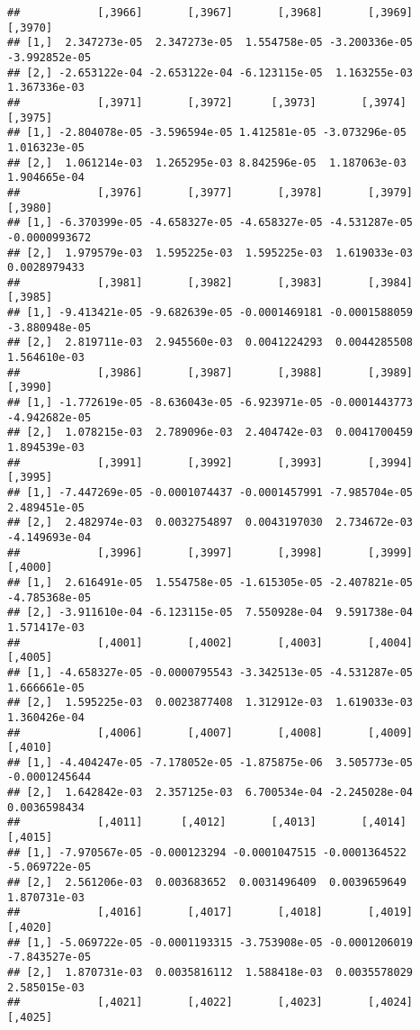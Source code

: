 \documentclass[
]{article}
\begin{document}
\begin{verbatim}
##            [,3966]       [,3967]       [,3968]       [,3969]       [,3970]
## [1,]  2.347273e-05  2.347273e-05  1.554758e-05 -3.200336e-05 -3.992852e-05
## [2,] -2.653122e-04 -2.653122e-04 -6.123115e-05  1.163255e-03  1.367336e-03
##            [,3971]       [,3972]      [,3973]       [,3974]      [,3975]
## [1,] -2.804078e-05 -3.596594e-05 1.412581e-05 -3.073296e-05 1.016323e-05
## [2,]  1.061214e-03  1.265295e-03 8.842596e-05  1.187063e-03 1.904665e-04
##            [,3976]       [,3977]       [,3978]       [,3979]       [,3980]
## [1,] -6.370399e-05 -4.658327e-05 -4.658327e-05 -4.531287e-05 -0.0000993672
## [2,]  1.979579e-03  1.595225e-03  1.595225e-03  1.619033e-03  0.0028979433
##            [,3981]       [,3982]       [,3983]       [,3984]       [,3985]
## [1,] -9.413421e-05 -9.682639e-05 -0.0001469181 -0.0001588059 -3.880948e-05
## [2,]  2.819711e-03  2.945560e-03  0.0041224293  0.0044285508  1.564610e-03
##            [,3986]       [,3987]       [,3988]       [,3989]       [,3990]
## [1,] -1.772619e-05 -8.636043e-05 -6.923971e-05 -0.0001443773 -4.942682e-05
## [2,]  1.078215e-03  2.789096e-03  2.404742e-03  0.0041700459  1.894539e-03
##            [,3991]       [,3992]       [,3993]       [,3994]       [,3995]
## [1,] -7.447269e-05 -0.0001074437 -0.0001457991 -7.985704e-05  2.489451e-05
## [2,]  2.482974e-03  0.0032754897  0.0043197030  2.734672e-03 -4.149693e-04
##            [,3996]       [,3997]       [,3998]       [,3999]       [,4000]
## [1,]  2.616491e-05  1.554758e-05 -1.615305e-05 -2.407821e-05 -4.785368e-05
## [2,] -3.911610e-04 -6.123115e-05  7.550928e-04  9.591738e-04  1.571417e-03
##            [,4001]       [,4002]       [,4003]       [,4004]      [,4005]
## [1,] -4.658327e-05 -0.0000795543 -3.342513e-05 -4.531287e-05 1.666661e-05
## [2,]  1.595225e-03  0.0023877408  1.312912e-03  1.619033e-03 1.360426e-04
##            [,4006]       [,4007]       [,4008]       [,4009]       [,4010]
## [1,] -4.404247e-05 -7.178052e-05 -1.875875e-06  3.505773e-05 -0.0001245644
## [2,]  1.642842e-03  2.357125e-03  6.700534e-04 -2.245028e-04  0.0036598434
##            [,4011]      [,4012]       [,4013]       [,4014]       [,4015]
## [1,] -7.970567e-05 -0.000123294 -0.0001047515 -0.0001364522 -5.069722e-05
## [2,]  2.561206e-03  0.003683652  0.0031496409  0.0039659649  1.870731e-03
##            [,4016]       [,4017]       [,4018]       [,4019]       [,4020]
## [1,] -5.069722e-05 -0.0001193315 -3.753908e-05 -0.0001206019 -7.843527e-05
## [2,]  1.870731e-03  0.0035816112  1.588418e-03  0.0035578029  2.585015e-03
##            [,4021]       [,4022]       [,4023]       [,4024]      [,4025]

\end{verbatim}
\end{document}
